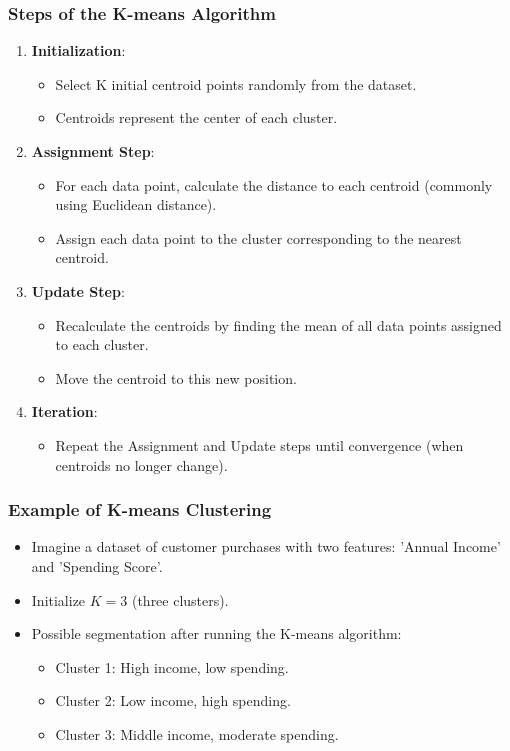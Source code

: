 \documentclass[aspectratio=169]{beamer}
\begin{document}
\begin{frame}[fragile]
    \frametitle{Steps of the K-means Algorithm}
    \begin{enumerate}
        \item \textbf{Initialization}:
        \begin{itemize}
            \item Select K initial centroid points randomly from the dataset.
            \item Centroids represent the center of each cluster.
        \end{itemize}
        \item \textbf{Assignment Step}:
        \begin{itemize}
            \item For each data point, calculate the distance to each centroid (commonly using Euclidean distance).
            \item Assign each data point to the cluster corresponding to the nearest centroid.
        \end{itemize}
        \item \textbf{Update Step}:
        \begin{itemize}
            \item Recalculate the centroids by finding the mean of all data points assigned to each cluster.
            \item Move the centroid to this new position.
        \end{itemize}
        \item \textbf{Iteration}:
        \begin{itemize}
            \item Repeat the Assignment and Update steps until convergence (when centroids no longer change).
        \end{itemize}
    \end{enumerate}
\end{frame}

\begin{frame}[fragile]
    \frametitle{Example of K-means Clustering}
    \begin{itemize}
        \item Imagine a dataset of customer purchases with two features: 'Annual Income' and 'Spending Score'.
        \item Initialize \( K = 3 \) (three clusters).
        \item Possible segmentation after running the K-means algorithm:
        \begin{itemize}
            \item Cluster 1: High income, low spending.
            \item Cluster 2: Low income, high spending.
            \item Cluster 3: Middle income, moderate spending.
        \end{itemize}
    \end{itemize}
\end{frame}
\end{document}
